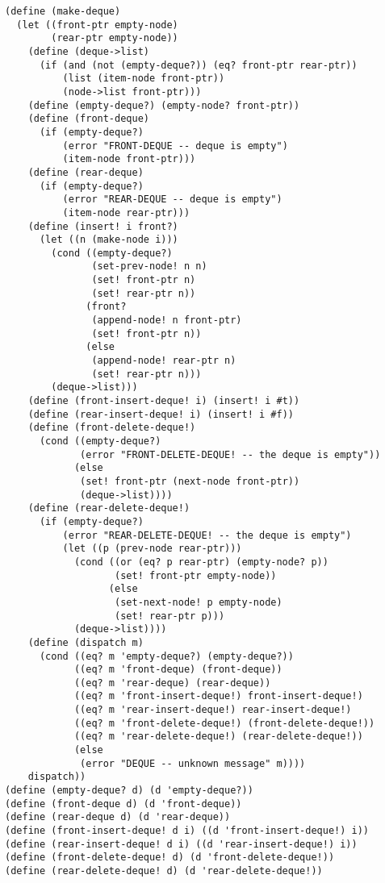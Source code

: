 \documentclass[a4paper,12pt]{article}
\begin{document}
\begin{lstlisting}
(define (make-deque)
  (let ((front-ptr empty-node)
        (rear-ptr empty-node))
    (define (deque->list)
      (if (and (not (empty-deque?)) (eq? front-ptr rear-ptr))
          (list (item-node front-ptr))
          (node->list front-ptr)))
    (define (empty-deque?) (empty-node? front-ptr))
    (define (front-deque)
      (if (empty-deque?)
          (error "FRONT-DEQUE -- deque is empty")
          (item-node front-ptr)))
    (define (rear-deque)
      (if (empty-deque?)
          (error "REAR-DEQUE -- deque is empty")
          (item-node rear-ptr)))
    (define (insert! i front?)
      (let ((n (make-node i)))
        (cond ((empty-deque?)
               (set-prev-node! n n)
               (set! front-ptr n)
               (set! rear-ptr n))
              (front?
               (append-node! n front-ptr)
               (set! front-ptr n))
              (else
               (append-node! rear-ptr n)
               (set! rear-ptr n)))
        (deque->list)))
    (define (front-insert-deque! i) (insert! i #t))
    (define (rear-insert-deque! i) (insert! i #f))
    (define (front-delete-deque!)
      (cond ((empty-deque?)
             (error "FRONT-DELETE-DEQUE! -- the deque is empty"))
            (else
             (set! front-ptr (next-node front-ptr)) 
             (deque->list))))
    (define (rear-delete-deque!)
      (if (empty-deque?)
          (error "REAR-DELETE-DEQUE! -- the deque is empty")
          (let ((p (prev-node rear-ptr)))
            (cond ((or (eq? p rear-ptr) (empty-node? p)) 
                   (set! front-ptr empty-node))
                  (else
                   (set-next-node! p empty-node)
                   (set! rear-ptr p)))
            (deque->list))))
    (define (dispatch m)
      (cond ((eq? m 'empty-deque?) (empty-deque?))
            ((eq? m 'front-deque) (front-deque))
            ((eq? m 'rear-deque) (rear-deque))
            ((eq? m 'front-insert-deque!) front-insert-deque!)
            ((eq? m 'rear-insert-deque!) rear-insert-deque!)
            ((eq? m 'front-delete-deque!) (front-delete-deque!))
            ((eq? m 'rear-delete-deque!) (rear-delete-deque!))
            (else
             (error "DEQUE -- unknown message" m))))
    dispatch))
(define (empty-deque? d) (d 'empty-deque?))
(define (front-deque d) (d 'front-deque))
(define (rear-deque d) (d 'rear-deque))
(define (front-insert-deque! d i) ((d 'front-insert-deque!) i))
(define (rear-insert-deque! d i) ((d 'rear-insert-deque!) i))
(define (front-delete-deque! d) (d 'front-delete-deque!))
(define (rear-delete-deque! d) (d 'rear-delete-deque!))
\end{lstlisting}
\end{document}
